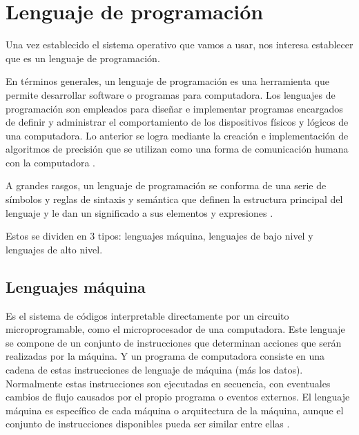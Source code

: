 
\section{Lenguaje de programación}

Una vez establecido el sistema operativo que vamos a usar, nos interesa establecer que es un lenguaje de programación.
\begin{list}{}%
    {\setlength{\leftmargin}{1cm}\setlength{\rightmargin}{1cm}}
    \item\relax
    \small
En términos generales, un lenguaje de programación es una herramienta que permite desarrollar software o programas para computadora. Los lenguajes de programación son empleados para diseñar e implementar programas encargados de definir y administrar el comportamiento de los dispositivos físicos y lógicos de una computadora. Lo anterior se logra mediante la creación e implementación de algoritmos de precisión que se utilizan como una forma de comunicación humana con la computadora \cite{CitaD10}.

A grandes rasgos, un lenguaje de programación se conforma de una serie de símbolos y reglas de sintaxis y semántica que definen la estructura principal del lenguaje y le dan un significado a sus elementos y expresiones \cite{CitaD10}.
\end{list}
Estos se dividen en 3 tipos: lenguajes máquina, lenguajes de bajo nivel y lenguajes de alto nivel.


\subsection{Lenguajes máquina}

\begin{list}{}%
    {\setlength{\leftmargin}{1cm}\setlength{\rightmargin}{1cm}}
    \item\relax
    \small

Es el sistema de códigos interpretable directamente por un circuito microprogramable, como el microprocesador de una computadora. Este lenguaje se compone de un conjunto de instrucciones que determinan acciones que serán realizadas por la máquina. Y un programa de computadora consiste en una cadena de estas instrucciones de lenguaje de máquina (más los datos). Normalmente estas instrucciones son ejecutadas en secuencia, con eventuales cambios de flujo causados por el propio programa o eventos externos. El lenguaje máquina es específico de cada máquina o arquitectura de la máquina, aunque el conjunto de instrucciones disponibles pueda ser similar entre ellas \cite{CitaD10}.

\end{list}


